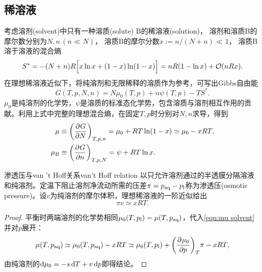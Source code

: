 \subsection{稀溶液}

考虑溶剂(solvent)中只有一种溶质(solute) B的稀溶液(solution)，
溶剂和溶质B的摩尔数分别为$N,n\,(n \ll N)$，
溶质B的摩尔分数$x := n/(N + n) \ll 1$，
溶质B溶于溶液的混合熵
\begin{equation}
	S^* = -(N + n)R\Bigl[x\ln x + (1 - x)\ln(1 - x)\Bigr]
	= nR(1 - \ln x) + \mathcal{O}(nRx).
\end{equation}
在理想稀溶液近似下，将纯溶剂和无限稀释的溶质作为参考，可写出Gibbs自由能
\[
	G(T,p,N,n) = N\mu_0(T,p) + n\psi(T,p) - TS^*.
\]
$\mu_0$是纯溶剂的化学势，$\psi$是溶质的标准态化学势，包含溶质与溶剂相互作用的贡献。利用上式中完整的理想混合熵，在固定$T,p$时分别对$N,n$求导，得到
\begin{subequations}
	\begin{align}
		\label{eqn:mu solvent}
		\mu & \equiv \biggl(\frac{\partial^{}G}{\partial{N}^{}}\biggr)_{T,p,n} = \mu_0 + RT\ln(1 - x) \simeq \mu_0 - xRT,\\
		\label{eqn:mu solute}
		\mu_\mathrm{B} & \equiv \biggl(\frac{\partial^{}G}{\partial{n}^{}}\biggr)_{T,p,N} = \psi + RT\ln x.
	\end{align}
\end{subequations}

\begin{theorem}
	{渗透压与van ’t Hoff关系}{van't Hoff relation}
	以只允许溶剂通过的半透膜分隔溶液和纯溶剂。定温下阻止溶剂净流动所需的压差$\pi = p_{\mathrm{aq}} - p_\mathrm l$称为渗透压(osmotic pressure)。设$v$为纯溶剂的摩尔体积，理想稀溶液的一阶近似给出
	\begin{equation}
		\label{eqn:van't Hoff}
		\pi v \simeq xRT.
	\end{equation}
	\begin{notecaptionblock}
	\end{notecaptionblock}
\end{theorem}

\begin{proof}
	平衡时两端溶剂的化学势相同$\mu_0(T,p_\mathrm l) = \mu(T,p_{\mathrm{aq}})$，代入\eqref{eqn:mu solvent}并对$p$展开：
	\[
		\mu(T,p_{\mathrm{aq}}) \simeq \mu_0(T,p_{\mathrm{aq}}) - xRT \simeq \mu_0(T,p_\mathrm l) + \biggl(\frac{\partial^{}\mu_0}{\partial{p}^{}}\biggr)_{T}\pi - xRT,
	\]
	由纯溶剂的$\mathop{}\!\mathrm{d}\mu_0 = -s\mathop{}\!\mathrm{d} T + v\mathop{}\!\mathrm{d} p$即得结论。
\end{proof}

